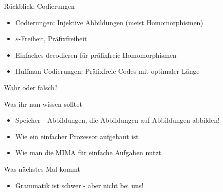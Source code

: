\framePrevEpisode

\begin{frame}{Rückblick: Codierungen}
	\begin{itemize}
		\item Codierungen: Injektive Abbildungen (meist Homomorphismen)
		\item $\varepsilon$-Freiheit, Präfixfreiheit
		\item Einfaches decodieren für präfixfreie Homomorphismen
		\item Huffman-Codierungen: Präfixfreie Codes mit optimaler Länge
	\end{itemize}
\end{frame}

\begin{frame}
	\begin{block}{Wahr oder falsch?}
	\begin{itemize}
				
	\end{itemize}
	\end{block}
\end{frame}









\begin{frame}	
	\begin{block}{Was ihr nun wissen solltet}
		\begin{itemize}
			\item Speicher - Abbildungen, die Abbildungen auf Abbildungen abbilden!
			\item Wie ein einfacher Prozessor aufgebaut ist
			\item Wie man die MIMA für einfache Aufgaben nutzt
		\end{itemize}
	\end{block}
	
	\begin{block}{Was nächstes Mal kommt}
		\begin{itemize}
			\item Grammatik ist schwer - aber nicht bei uns!
		\end{itemize}
	\end{block}
\end{frame}


\slideThanks

